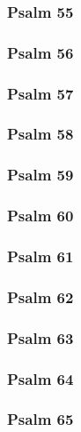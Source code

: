 \documentclass[12pt]{extarticle}
\begin{document}
\begin{multicols}{2}
\subsubsection{Psalm 55}

\newpage

\subsubsection{Psalm 56}

\newpage

\subsubsection{Psalm 57}

\newpage

\subsubsection{Psalm 58}

\newpage

\subsubsection{Psalm 59}

\newpage

\subsubsection{Psalm 60}

\newpage

\subsubsection{Psalm 61}

\newpage

\subsubsection{Psalm 62}

\newpage

\subsubsection{Psalm 63}

\newpage

\subsubsection{Psalm 64}

\newpage

\subsubsection{Psalm 65}

\newpage


\end{multicols}
\end{document}
